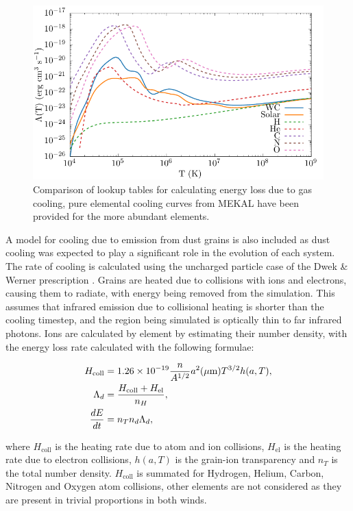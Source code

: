 \begin{figure}[ht]
  \centering
  \includegraphics{assets/cooling-curve/cooling-curve.pdf}
  \caption[WR and OB $\Lambda(T)$ cooling curves]{Comparison of lookup tables for calculating energy loss due to gas cooling, pure elemental cooling curves from MEKAL have been provided for the more abundant elements.}
  \label{fig:cooling-curve}
\end{figure}

A model for cooling due to emission from dust grains is also included as dust cooling was expected to play a significant role in the evolution of each system.
The rate of cooling is calculated using the uncharged particle case of the Dwek \& Werner prescription \parencite{dwek_infrared_1981}.
Grains are heated due to collisions with ions and electrons, causing them to radiate, with energy being removed from the simulation.
This assumes that infrared emission due to collisional heating is shorter than the cooling timestep, and the region being simulated is optically thin to far infrared photons.
Ions are calculated by element by estimating their number density, with the energy loss rate calculated with the following formulae:

\begin{subequations}
  \begin{align}
    H_\text{coll} & = 1.26 \times 10^{-19} \frac{n}{A^{1/2}} a^2(\mu \text m) T^{3/2} h(a,T) , \\
        \Lambda_d & = \frac{H_\text{coll} + H_\text{el}}{n_H} , \\
    \frac{dE}{dt} & = n_T n_d \Lambda_d ,
  \end{align}
\end{subequations}

where $H_\text{coll}$ is the heating rate due to atom and ion collisions, $H_\text{el}$ is the heating rate due to electron collisions, $h(a,T)$ is the grain-ion transparency and $n_T$ is the total number density.
$H_\text{coll}$ is summated for Hydrogen, Helium, Carbon, Nitrogen and Oxygen atom collisions, other elements are not considered as they are present in trivial proportions in both winds.

